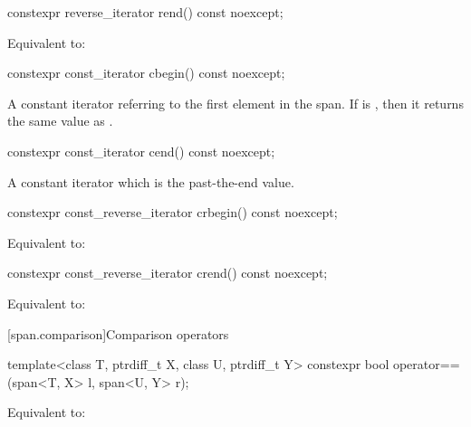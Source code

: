 \begin{codeblock}
\begin{codeblock}
\begin{codeblock}
%
\begin{itemdecl}
constexpr reverse_iterator rend() const noexcept;
\end{itemdecl}
\begin{itemdescr}
\pnum
\returns
Equivalent to: 
\end{itemdescr}

%
\begin{itemdecl}
constexpr const_iterator cbegin() const noexcept;
\end{itemdecl}
\begin{itemdescr}
\pnum
\returns
A constant iterator referring to the first element in the span.
If  is , then it returns the same value
as .
\end{itemdescr}

%
\begin{itemdecl}
constexpr const_iterator cend() const noexcept;
\end{itemdecl}
\begin{itemdescr}
\pnum
\returns
A constant iterator which is the past-the-end value.
\end{itemdescr}

%
\begin{itemdecl}
constexpr const_reverse_iterator crbegin() const noexcept;
\end{itemdecl}
\begin{itemdescr}
\pnum
\effects
Equivalent to: 
\end{itemdescr}

%
\begin{itemdecl}
constexpr const_reverse_iterator crend() const noexcept;
\end{itemdecl}
\begin{itemdescr}
\pnum
\effects
Equivalent to: 
\end{itemdescr}

[span.comparison]{Comparison operators}

%
\begin{itemdecl}
template<class T, ptrdiff_t X, class U, ptrdiff_t Y>
  constexpr bool operator==(span<T, X> l, span<U, Y> r);
\end{itemdecl}
\begin{itemdescr}
\pnum
\effects
Equivalent to: 
\end{itemdescr}


\end{codeblock}
\end{codeblock}
\end{codeblock}
